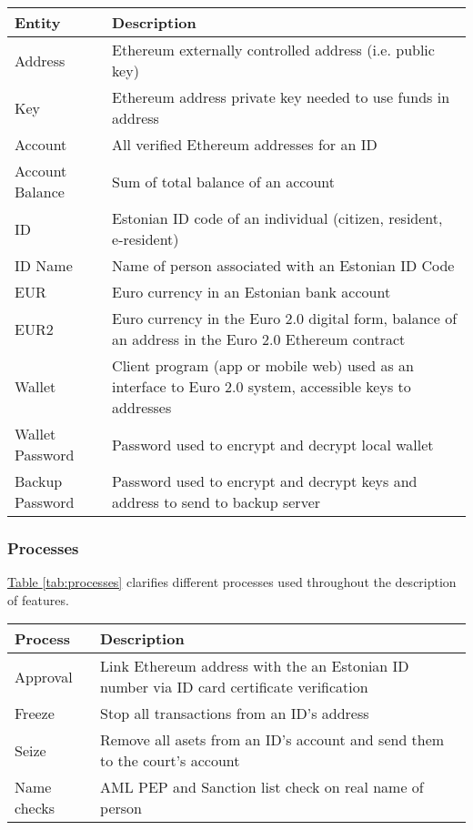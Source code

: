 \documentclass[12pt]{article} %
\newcommand{\hypertableref}[1]{\hyperref[#1]{Table \ref{#1}}}
\begin{document}
{{\begin{center}
\begin{tabular}{ | p{3cm} | p{12cm} | }
 \hline
 Entity & Description
 \\ \hline\hline
 Address & Ethereum externally controlled address (i.e. public key)
 \\ \hline
 Key & Ethereum address private key needed to use funds in address
 \\ \hline
 Account & All verified Ethereum addresses for an ID
 \\ \hline
 Account Balance & Sum of total balance of an account
 \\ \hline
 ID & Estonian ID code of an individual (citizen, resident, e-resident)
 \\ \hline
 ID Name & Name of person associated with an Estonian ID Code
 \\ \hline
 EUR & Euro currency in an Estonian bank account
 \\ \hline
 EUR2 & Euro currency in the Euro 2.0 digital form, balance of an address in the Euro 2.0 Ethereum contract
 \\ \hline
 Wallet & Client program (app or mobile web) used as an interface to Euro 2.0 system, accessible keys to addresses
 \\ \hline
 Wallet Password & Password used to encrypt and decrypt local wallet
 \\ \hline
 Backup Password & Password used to encrypt and decrypt keys and address to send to backup server
 \\ \hline
\end{tabular}
\end{center}
\label{tab:entities}

\subsubsection{Processes} \label{sssec:3.3:processes}

\hypertableref{tab:processes} clarifies different processes used throughout the description of features.

\begin{center}
\begin{tabular}{ | p{3cm} | p{12cm} | }
 \hline
 Process & Description
 \\ \hline\hline
 Approval & Link Ethereum address with the an Estonian ID number via ID card certificate verification
 \\ \hline
 Freeze & Stop all transactions from an ID's address
 \\ \hline
 Seize & Remove all asets from an ID's account and send them to the court's account
 \\ \hline
 Name checks & AML PEP and Sanction list check on real name of person
 \\ \hline
\end{tabular}
\end{center}
\label{tab:processes}

}}
\end{document}
